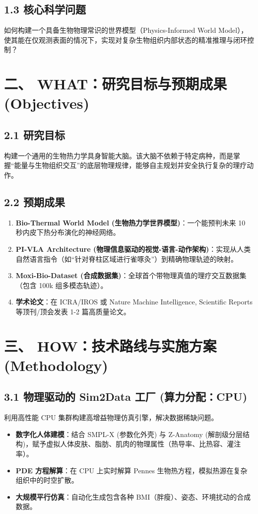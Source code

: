 \documentclass[a4paper,12pt]{article}
\begin{document}
\subsection{1.3 核心科学问题}
如何构建一个具备生物物理常识的世界模型（Physics-Informed World Model）\cite{karniadakis2021physics}，使其能在仅观测表面的情况下，实现对复杂生物组织内部状态的精准推理与闭环控制？

\section{二、 WHAT：研究目标与预期成果 (Objectives)}

\subsection{2.1 研究目标}
构建一个通用的生物热力学具身智能大脑。该大脑不依赖于特定病种，而是掌握“能量与生物组织交互”的底层物理规律\cite{pennes1948analysis, raissi2019physics}，能够自主规划并安全执行复杂的理疗动作。

\subsection{2.2 预期成果}
\begin{enumerate}
    \item \textbf{Bio-Thermal World Model (生物热力学世界模型)}：一个能预判未来 10 秒内皮下热分布演化的神经网络。
    \item \textbf{PI-VLA Architecture (物理信息驱动的视觉-语言-动作架构)}：实现从人类自然语言指令（如“针对脊柱区域进行雀啄灸”）到精确物理轨迹的映射。
    \item \textbf{Moxi-Bio-Dataset (合成数据集)}：全球首个带物理真值的理疗交互数据集（包含 100k 组多模态轨迹）。
    \item \textbf{学术论文}：在 ICRA/IROS 或 Nature Machine Intelligence, Scientific Reports 等顶刊/顶会发表 1-2 篇高质量论文。
\end{enumerate}

\section{三、 HOW：技术路线与实施方案 (Methodology)}

\subsection{3.1 物理驱动的 Sim2Data 工厂 (算力分配：CPU)}
利用高性能 CPU 集群构建高增益物理仿真引擎\cite{makoviychuk2021isaac}，解决数据稀缺问题。
\begin{itemize}
    \item \textbf{数字化人体建模}：结合 SMPL-X (参数化外壳) 与 Z-Anatomy (解剖级分层结构)，赋予虚拟人体皮肤、脂肪、肌肉的物理属性（热导率、比热容、灌注率）。
    \item \textbf{PDE 方程解算}：在 CPU 上实时解算 Pennes 生物热方程\cite{pennes1948analysis}，模拟热源在复杂组织中的时空扩散。
    \item \textbf{大规模平行仿真}：自动化生成包含各种 BMI（胖瘦）、姿态、环境扰动的合成数据。
\end{itemize}
\end{document}
